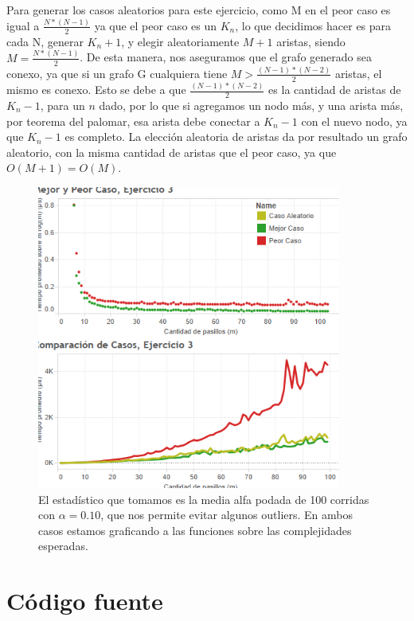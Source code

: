 \documentclass{article}
\theoremstyle{definition}
\theoremstyle{remark}
\begin{document}
Para generar los casos aleatorios para este ejercicio, como M en el peor caso es igual a $\frac{N*(N-1)}{2}$ ya que el peor caso es un $K_n$, lo que decidimos hacer es para cada N, generar
$K_n+1$, y elegir aleatoriamente $M+1$ aristas, siendo $M = \frac{N*(N-1)}{2}$. De esta manera, nos aseguramos que el grafo generado sea conexo, ya que si un grafo G cualquiera tiene $ M > \frac{(N-1)*(N-2)}{2}$ aristas, el mismo es conexo. Esto se debe a que $\frac{(N-1)*(N-2)}{2}$ es la cantidad de aristas de $K_n-1$, para un $n$ dado, por lo que si agregamos un nodo más, y una arista más, por teorema del palomar, esa arista debe conectar a $K_n-1$ con el nuevo nodo, ya que $K_n-1$ es completo. La elección aleatoria de aristas da por resultado un grafo aleatorio, con la misma cantidad de aristas que el peor caso, ya que $O(M+1) = O(M)$.



\begin{figure}
\centering
\includegraphics[width=10cm]{ex3}
\caption{El estadístico que tomamos es la media alfa podada de 100 corridas con $\alpha = 0.10$, que nos permite evitar algunos outliers. En ambos casos estamos graficando a las funciones sobre las complejidades esperadas. \label{grf:ex3}}
\end{figure}

\pagebreak

\section{Código fuente}

\lstset{inputencoding=utf8/latin1}
\lstset{basicstyle=\footnotesize\ttfamily,breaklines=true}
\lstset{framextopmargin=50pt,frame=bottomline}
\end{document}
